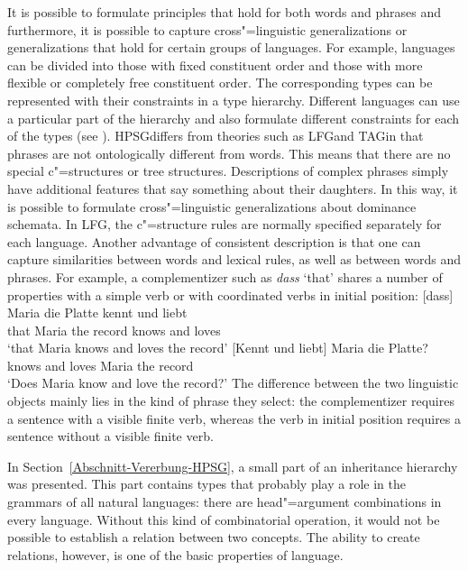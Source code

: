 It is possible to formulate principles that hold for both words and phrases and furthermore, it is possible to capture
cross"=linguistic generalizations or generalizations that hold for certain groups of languages. For example, languages can be divided
into those with fixed constituent order and those with more flexible or completely free constituent order. The corresponding types can be represented
with their constraints in a type hierarchy. Different languages can use a particular part of the hierarchy and also formulate
different constraints for each of the types (see \citealp[Section~9.2]{AW98a}).
HPSG\indexhpsg differs from theories such as LFG\indexlfg and TAG\indextag in that phrases are not
ontologically different from words. This means that there are no special c"=structures or tree structures. Descriptions of complex phrases simply have additional
features that say something about their daughters. In this way, it is possible to formulate cross"=linguistic generalizations
about dominance schemata. In LFG, the c"=structure rules are normally specified separately for each language.
Another advantage of consistent description is that one can capture similarities between words and
lexical rules, as well as between words and phrases. For example, a complementizer such as \emph{dass} `that' shares a number of
properties with a simple verb or with coordinated verbs in initial position:
\eal
\ex
\gll {}[dass] Maria die Platte kennt und liebt\\
	 {}\spacebr{}that Maria the record knows and loves\\
\glt `that Maria knows and loves the record'
\ex 
\gll {}[Kennt und liebt] Maria die Platte?\\
	 {}\spacebr{}knows and loves Maria the record\\
\glt `Does Maria know and love the record?'
\zl
The difference between the two linguistic objects mainly lies in the kind of phrase they select: the complementizer requires a sentence
with a visible finite verb, whereas the verb in initial position requires a sentence without a visible finite verb.

In Section~\ref{Abschnitt-Vererbung-HPSG}, a small part of an inheritance hierarchy was
presented. This part contains types
that probably play a role in the grammars of all natural languages: there are head"=argument combinations in every language. Without this
kind of combinatorial operation, it would not be possible to establish a relation between two concepts. The ability to create relations, however, is
one of the basic properties of language.

